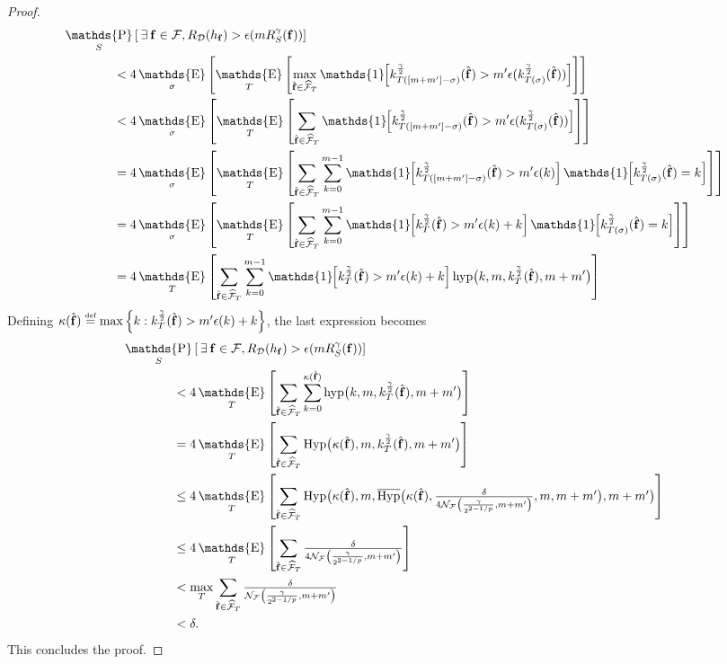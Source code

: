 \documentclass[twoside,11pt]{article}
\newcommand{\Id}[1]{\mathds{1}\hspace{-2.5pt}\left[#1\right]}
\let\oldexists=\exists
\renewcommand{\exists}{\hspace{1pt}\oldexists\hspace{1pt}}
\newcommand{\pr}[1]{\left(#1\right)}
\newcommand{\cb}[1]{\left\{#1\right\}}
\newcommand{\D}{\mathcal{D}}
\newcommand{\F}{\mathcal{F}}
\newcommand{\f}{\mathbf{f}}
\newcommand{\N}{\mathcal{N}}
\newcommand{\fhat}{\hat{\f}}
\newcommand{\fcover}{\widehat{\F}_T}
\newcommand{\eqdef}{\overset{\smash{\mbox{\tiny \rm def}}}{=}}
\DeclareMathOperator*{\Prob}{\mathds{P}}
\newcommand{\prob}[2]{\Prob_{#1}\left[#2\right]}
\DeclareMathOperator*{\Expectation}{\mathds{E}}
\newcommand{\exv}[2]{\Expectation_{#1}\left[#2\right]}
\newcommand{\hyp}{\textnormal{hyp}}
\newcommand{\Hyp}{\textnormal{Hyp}}
\newcommand{\HypInv}{\overline{\textnormal{Hyp}}}
\begin{document}
\begin{proof}
\begin{align*}
&\prob{S}{ \exists \f \in \F, R_\D(h_\f) > \epsilon(m R^\gamma_S(\f)) }\\
&\hspace{40pt}< 4 \exv{\sigma}{\exv{T}{ \max_{\fhat \in \fcover} \Id{k^{\frac{\gamma}{2}}_{T([m+m']-\sigma)}(\fhat) > m' \epsilon(k^\frac{\gamma}{2}_{T(\sigma)}(\fhat)) } }}\\
&\hspace{40pt}< 4 \exv{\sigma}{\exv{T}{ \sum_{\fhat \in \fcover} \Id{k^{\frac{\gamma}{2}}_{T([m+m']-\sigma)}(\fhat) > m' \epsilon(k^\frac{\gamma}{2}_{T(\sigma)}(\fhat)) } }}\\
&\hspace{40pt}= 4 \exv{\sigma}{\exv{T}{ \sum_{\fhat \in \fcover} \sum_{k=0}^{m-1} \Id{k^{\frac{\gamma}{2}}_{T([m+m']-\sigma)}(\fhat) > m'\epsilon(k) } \Id{k^\frac{\gamma}{2}_{T(\sigma)}(\fhat) = k} }}\\
&\hspace{40pt}= 4 \exv{\sigma}{\exv{T}{ \sum_{\fhat \in \fcover} \sum_{k=0}^{m-1} \Id{k^{\frac{\gamma}{2}}_{T}(\fhat) > m'\epsilon(k) + k } \Id{k^\frac{\gamma}{2}_{T(\sigma)}(\fhat) = k} }}\\
&\hspace{40pt}= 4 \exv{T}{ \sum_{\fhat \in \fcover} \sum_{k=0}^{m-1} \Id{k^{\frac{\gamma}{2}}_{T}(\fhat) > m'\epsilon(k) + k } \hyp\big(k,m, k^\frac{\gamma}{2}_{T}(\fhat), m+m'\big) }\\
\end{align*}
Defining $\kappa(\fhat) \eqdef \max\cb{k : k^{\frac{\gamma}{2}}_{T}(\fhat) > m'\epsilon(k) + k}$, the last expression becomes
\begin{align*}
&\prob{S}{ \exists \f \in \F, R_\D(h_\f) > \epsilon(m R^\gamma_S(\f)) }\\
&\hspace{40pt}< 4 \exv{T}{ \sum_{\fhat \in \fcover} \sum_{k=0}^{\kappa(\fhat)}  \hyp\big(k,m, k^\frac{\gamma}{2}_{T}(\fhat), m+m'\big) }\\
&\hspace{40pt}= 4 \exv{T}{ \sum_{\fhat \in \fcover} \Hyp\big(\kappa(\fhat),m, k^\frac{\gamma}{2}_{T}(\fhat), m+m'\big) }\\
&\hspace{40pt}\le 4 \exv{T}{ \sum_{\fhat \in \fcover} \Hyp\big(\kappa(\fhat),m, \HypInv\big(\kappa(\fhat), \textstyle \frac{\delta}{4 \N_\F\pr{\frac{\gamma}{2^{2 - 1/p}}, m + m'}}, m, m + m'\big), m+m'\big) }\\
&\hspace{40pt}\le 4 \exv{T}{ \sum_{\fhat \in \fcover} \textstyle \frac{\delta}{4 \N_\F\pr{\frac{\gamma}{2^{2 - 1/p}}, m + m'}} }\\
&\hspace{40pt}< \max_T \sum_{\fhat \in \fcover} \textstyle \frac{\delta}{ \N_\F\pr{\frac{\gamma}{2^{2 - 1/p}}, m + m'}}\\
&\hspace{40pt}< \delta.
\end{align*}
This concludes the proof.
\end{proof}
\end{document}
